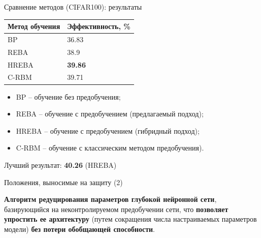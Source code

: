 \documentclass[10pt]{beamer}
\begin{document}
        \begin{frame}{Сравнение методов (CIFAR100): результаты}
            \begin{table} [!h]
              \small
            \centering
            \begin{tabular}{| p{3cm} | p{3cm} |}
              \hline
                \textbf{Метод обучения} & \textbf{Эффективность, \%}\\
                \hline
                BP & 36.83\\
                \hline
                REBA & 38.9\\
                \hline
                HREBA & \textbf{39.86}\\
                \hline
                C-RBM & 39.71\\
                \hline
            \end{tabular}
            \end{table}
            \begin{itemize}
                \item BP -- обучение без предобучения; 
                \item REBA -- обучение с предобучением (предлагаемый подход); 
                \item HREBA -- обучение с предобучением (гибридный подход);
                \item C-RBM -- обучение с классическим методом предобучения).
            \end{itemize}
            Лучший результат: \textbf{40.26} (HREBA)\\
        \end{frame}

        \begin{frame}{Положения, выносимые на защиту (2)}
            \begin{block}{2}
                \large
                \textbf{Алгоритм редуцирования параметров глубокой нейронной сети}, базирующийся на неконтролируемом предобучении сети, что \textbf{позволяет упростить ее архитектуру} (путем сокращения числа настраиваемых параметров модели) \textbf{без потери обобщающей способности}.
            \end{block}
        \end{frame}
\end{document}
